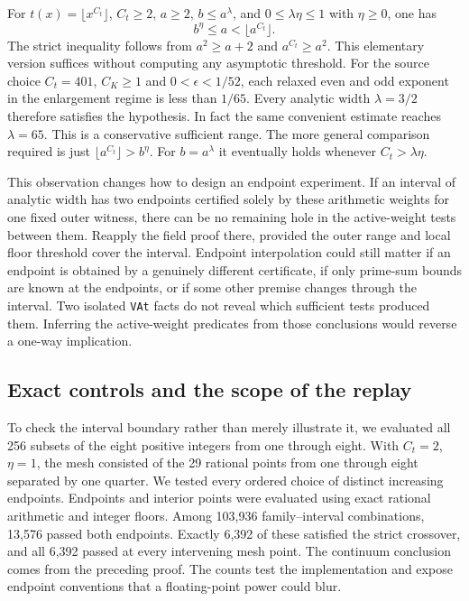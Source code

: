 \documentclass[12pt,letterpaper]{article}
\begin{document}
For $t(x)=\lfloor x^{C_t}\rfloor$, $C_t\geq2$, $a\geq2$, $b\leq a^\lambda$, and $0\leq\lambda\eta\leq1$ with $\eta\geq0$, one has
\[
        b^\eta\leq a<\lfloor a^{C_t}\rfloor .
\]
The strict inequality follows from $a^2\geq a+2$ and $a^{C_t}\geq a^2$. This elementary version suffices without computing any asymptotic threshold. For the source choice $C_t=401$, $C_K\geq1$ and $0<\epsilon<1/52$, each relaxed even and odd exponent in the enlargement regime is less than $1/65$. Every analytic width $\lambda=3/2$ therefore satisfies the hypothesis. In fact the same convenient estimate reaches $\lambda=65$. This is a conservative sufficient range. The more general comparison required is just $\lfloor a^{C_t}\rfloor>b^\eta$. For $b=a^\lambda$ it eventually holds whenever $C_t>\lambda\eta$.

This observation changes how to design an endpoint experiment. If an interval of analytic width has two endpoints certified solely by these arithmetic weights for one fixed outer witness, there can be no remaining hole in the active-weight tests between them. Reapply the field proof there, provided the outer range and local floor threshold cover the interval. Endpoint interpolation could still matter if an endpoint is obtained by a genuinely different certificate, if only prime-sum bounds are known at the endpoints, or if some other premise changes through the interval. Two isolated \texttt{VAt} facts do not reveal which sufficient tests produced them. Inferring the active-weight predicates from those conclusions would reverse a one-way implication.

\subsection{Exact controls and the scope of the replay}

To check the interval boundary rather than merely illustrate it, we evaluated all 256 subsets of the eight positive integers from one through eight. With $C_t=2$, $\eta=1$, the mesh consisted of the 29 rational points from one through eight separated by one quarter. We tested every ordered choice of distinct increasing endpoints. Endpoints and interior points were evaluated using exact rational arithmetic and integer floors. Among 103,936 family--interval combinations, 13,576 passed both endpoints. Exactly 6,392 of these satisfied the strict crossover, and all 6,392 passed at every intervening mesh point. The continuum conclusion comes from the preceding proof. The counts test the implementation and expose endpoint conventions that a floating-point power could blur.
\end{document}
